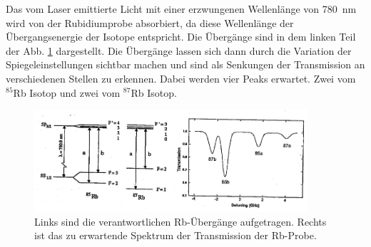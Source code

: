 Das vom Laser emittierte Licht mit einer erzwungenen Wellenlänge von \SI{780}{\nm} wird von der Rubidiumprobe absorbiert, da diese Wellenlänge der Übergangsenergie der Isotope entspricht. Die Übergänge sind in dem linken Teil der Abb. \ref{abb:Rb} dargestellt. Die Übergänge lassen sich dann durch die Variation der Spiegeleinstellungen sichtbar machen und sind als Senkungen der Transmission an verschiedenen Stellen zu erkennen. Dabei werden vier Peaks erwartet. Zwei vom $^{85}$Rb Isotop und zwei vom $^{87}$Rb Isotop. 

\begin{figure}
    \centering
    \includegraphics[width=0.9\textwidth]{pics/Rb_spectrum.jpg}
    \caption{Links sind die verantwortlichen Rb-Übergänge aufgetragen. Rechts ist das zu erwartende Spektrum der Transmission der Rb-Probe. \cite{anleitung}}
    \label{abb:Rb}
\end{figure}